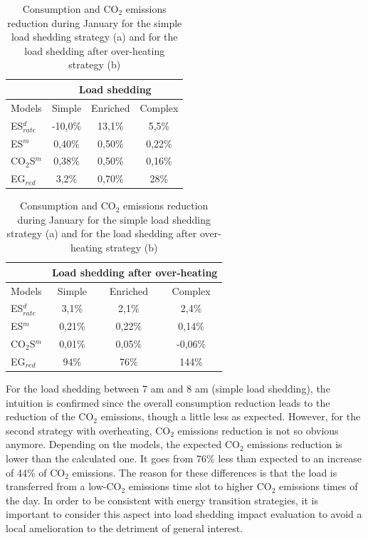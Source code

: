 \documentclass[buildings,article,submit,moreauthors,pdftex,10pt,a4paper]{mdpi}
\theoremstyle{mdpi}
\newcounter{ex}
\newcounter{re}
\theoremstyle{mdpidefinition}
\begin{document}
\begin{table}[H]
\caption{Consumption and CO$_2$ emissions reduction during January for the simple load shedding strategy (a) and for the load shedding after over-heating strategy (b)}
\label{results_CO2}

    \begin{minipage}{0.5\textwidth}
        \centering
              \begin{tabular}{lccc}
              \hline
              & \multicolumn{3}{c}{Load shedding} \\
              \hline
               Models & Simple & Enriched & Complex \\
             ES$_{rate}^{d}$ & -10,0\% & 13,1\% & 5,5\%\\
             ES$^{m}$ & 0,40\% & 0,50\% & 0,22\% \\
             CO$_{2}$S$^{m}$ & 0,38\% & 0,50\% & 0,16\% \\
             EG$_{red}$ & 3,2\% & 0,70\% & 28\% \\
             \hline
             \end{tabular}
    \end{minipage}
    \begin{minipage}{0.5\textwidth}
        \centering
              \begin{tabular}{lccc}
              \hline
              & \multicolumn{3}{c}{Load shedding after over-heating} \\
              \hline
               Models & Simple & Enriched & Complex \\
             ES$_{rate}^{d}$ & 3,1\% & 2,1\% & 2,4\% \\
             ES$^{m}$ & 0,21\% & 0,22\% & 0,14\% \\
             CO$_{2}$S$^{m}$ & 0,01\% & 0,05\% & -0,06\% \\
             EG$_{red}$ & 94\% & 76\% & 144\% \\
             \hline
             \end{tabular}
    \end{minipage}
\end{table}

For the load shedding between 7 am and 8 am (simple load shedding), the intuition is confirmed since the overall consumption reduction leads to the reduction of the CO$_2$ emissions, though a little less as expected. However, for the second strategy with overheating, CO$_2$ emissions reduction is not so obvious anymore. Depending on the models, the expected CO$_2$ emissions reduction is lower than the calculated one. It goes from 76\% less than expected to an increase of 44\% of CO$_2$ emissions. The reason for these differences is that the load is transferred from a low-CO$_2$ emissions time slot to higher CO$_2$ emissions times of the day.
In order to be consistent with energy transition strategies, it is important to consider this aspect into load shedding impact evaluation to avoid a local amelioration to the detriment of general interest.
\end{document}
